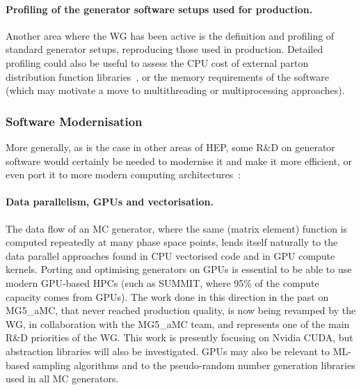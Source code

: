 \documentclass[11pt,a4paper]{article}
\begin{document}
\paragraph{Profiling of the generator software setups used for production.}
Another area where the WG has been active is the definition and
profiling of standard generator setups, reproducing those used in
production. Detailed profiling could also be useful to assess the CPU
cost of external parton distribution function libraries~\cite{Kon20}, or
the memory requirements of the software (which may motivate a move to
multithreading or multiprocessing approaches).

\subsubsection{Software Modernisation}

More generally, as is the case in other areas of HEP, some R\&D on
generator software would certainly be needed to modernise it and make it
more efficient, or even port it to more modern computing 
architectures~\cite{Bau13,Alves:2017she}:

\paragraph{Data parallelism, GPUs and vectorisation.} The data flow of an MC
generator, where the same (matrix element) function is computed
repeatedly at many phase space points, lends itself naturally to the
data parallel approaches found in CPU vectorised code and in GPU compute
kernels. Porting and optimising generators on GPUs is essential to be
able to use modern GPU-based HPCs (such as SUMMIT, where 95\% of the
compute capacity comes from GPUs). The work done in this direction in
the past on MG5\_aMC, that never reached production quality, is now
being revamped by the WG, in collaboration with the MG5\_aMC team, and
represents one of the main R\&D priorities of the WG. This work is
presently focusing on Nvidia CUDA, but abstraction libraries will also
be investigated. GPUs may also be relevant to ML-based sampling
algorithms and to the pseudo-random number generation libraries used in
all MC generators.
\end{document}
